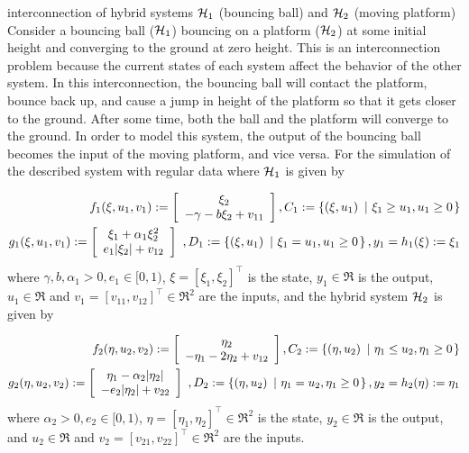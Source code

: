
\begin{example}{interconnection of hybrid systems $\mathcal{H}_1$ (bouncing ball) and $\mathcal{H}_2$ (moving platform)}
\label{ex:interconnection1}
Consider a bouncing ball ($\mathcal{H}_1$) bouncing on a platform ($\mathcal{H}_2$) at some initial height and converging to the ground at zero height. This is an interconnection problem because the current states of each system affect the behavior of the other system. In this interconnection, the bouncing ball will contact the platform, bounce back up, and cause a jump in height of the platform so that it gets closer to the ground. After some time, both the ball and the platform will converge to the ground. In order to model this system, the output of the bouncing ball becomes the input of the moving platform, and vice versa. For the simulation of the described system with regular data where $\mathcal{H}_1$ is given by

\begin{eqnarray}
f_1(\xi, u_1,v_1):=\left[
 \begin{array}{c}
   \xi_2 \\
 -\gamma - b\xi_2 +v_{11}
 \end{array}
\right],
   C_1 : = \left\{(\xi,u_1)\ \left| \ \xi_1 \geq u_1, u_1 \geq 0 \right.\right\}\\
g_1(\xi, u_1, v_1):=\left[ \begin{array}{c}
 \xi_1+\alpha_1\xi_2^2 \\
e_1|\xi_2| + v_{12}
\end{array}
\right]\ ,
    D_1: =\left\{(\xi,u_1)\ \left| \ \xi_1 =u_1, u_1 \geq 0 \right.\right\},
y_1 = h_1(\xi) : =\xi_1
\end{eqnarray}
where $\gamma, b, \alpha_1 >0, e_1 \in [0,1)$, $\xi = [\xi_1 , \xi_2]^\top$ is the state, $y_1 \in \Re$ is the output, $u_1 \in \Re$ and $v_1 = [v_{11} , v_{12}]^\top \in \Re^{2}$ are the inputs, and the hybrid system $\mathcal{H}_2$ is given by

\begin{eqnarray}
f_2(\eta,u_2,v_2):=\left[
 \begin{array}{c}
   \eta_2 \\
 -\eta_1-2\eta_2 +v_{12}
 \end{array}
\right],
   C_2 : = \left\{(\eta,u_2)\ \left| \ \eta_1 \leq u_2, \eta_1 \geq 0 \right.\right\}\\
g_2(\eta,u_2,v_2):=\left[ \begin{array}{c}
 \eta_1-\alpha_2|\eta_2| \\
-e_2|\eta_2| + v_{22}
\end{array}
\right]\ ,
    D_2: =\left\{(\eta,u_2)\ \left| \ \eta_1 = u_2, \eta_1 \geq 0 \right.\right\},
y_2 = h_2(\eta) : = \eta_1
\end{eqnarray}
where $\alpha_2 >0, e_2 \in [0,1)$, $\eta = [\eta_1 , \eta_2]^\top \in \Re^{2}$ is the state,
$y_2 \in \Re$ is the output, and $u_2 \in \Re$ and $v_2 = [v_{21} , v_{22}]^\top \in \Re^{2}$
are the inputs.


\end{example}
